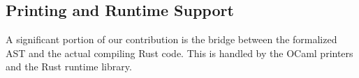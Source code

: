 \documentclass{llncs} %
\begin{document}


\subsection{Printing and Runtime Support}
\label{ssec:print-runtime}

A significant portion of our contribution is the bridge between the formalized AST and the actual compiling Rust code. This is handled by the OCaml printers and the Rust runtime library.
\end{document}

